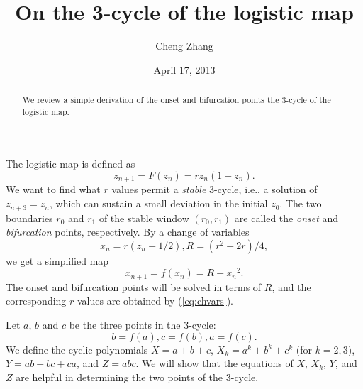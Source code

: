 \documentclass[twocolumn,prl]{revtex4-1}
\begin{document}
\title{On the 3-cycle of the logistic map}
\author{Cheng Zhang}
\date{April 17, 2013}
\begin{abstract}
We review a simple derivation of 
  the onset and bifurcation points the 3-cycle
  of the logistic map.
\end{abstract}
\maketitle


The logistic map is defined as
\[
  z_{n+1} = F(z_n) = r z_n (1 - z_n).
\]
We want to find what $r$ values permit a \emph{stable} 3-cycle,
i.e., a solution of $z_{n+3} = z_n$,
which can sustain a small deviation in the initial $z_0$.
The two boundaries $r_0$ and $r_1$ 
  of the stable window $(r_0, r_1)$
  are called the \emph{onset} and \emph{bifurcation} points, respectively.
%
By a change of variables
\begin{equation}
  x_n = r (z_n - 1/2),
  R = (r^2 - 2 r)/4,
\label{eq:chvars}
\end{equation}
we get a simplified map
\[
x_{n+1} = f(x_n) = R - {x_n}^2.
\]
The onset and bifurcation points will be solved
  in terms of $R$, and the corresponding $r$ values 
  are obtained by (\ref{eq:chvars}).


Let $a$, $b$ and $c$ be the three points in the 3-cycle:
\begin{equation}
  b=f(a), c=f(b), a=f(c).
\label{eq:abc}
\end{equation}
We define the cyclic polynomials
$X = a+b+c$,
$X_k = a^k+b^k+c^k$ (for $k = 2,3$),
$Y = ab+bc+ca$, and $Z = abc$.
We will show that the equations of $X$, $X_k$, $Y$, and $Z$
are helpful in determining the two points of the 3-cycle.
\end{document}
